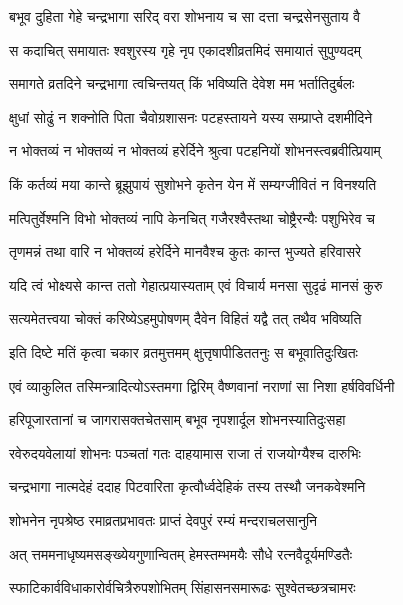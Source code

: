 \twolineshloka
{बभूव दुहिता गेहे चन्द्रभागा सरिद् वरा}
{शोभनाय च सा दत्ता चन्द्रसेनसुताय वै} %

\twolineshloka
{स कदाचित् समायातः श्वशुरस्य गृहे नृप}
{एकादशीव्रतमिदं समायातं सुपुण्यदम्} %

\twolineshloka
{समागते व्रतदिने चन्द्रभागा त्वचिन्तयत्}
{किं भविष्यति देवेश मम भर्तातिदुर्बलः} %

\twolineshloka
{क्षुधां सोढुं न शक्नोति पिता चैवोग्रशासनः}
{पटहस्तायने यस्य सम्प्राप्ते दशमीदिने} %

\twolineshloka
{न भोक्तव्यं न भोक्तव्यं न भोक्तव्यं हरेर्दिने}
{श्रुत्वा पटहनियों शोभनस्त्वब्रवीत्प्रियाम्} %

\twolineshloka
{किं कर्तव्यं मया कान्ते ब्रूझुपायं सुशोभने}
{कृतेन येन में सम्यग्जीवितं न विनश्यति} %


\twolineshloka
{मत्पितुर्वेश्मनि विभो भोक्तव्यं नापि केनचित्}
{गजैरश्वैस्तथा चोष्ट्रैरन्यैः पशुभिरेव च} %

\twolineshloka
{तृणमन्नं तथा वारि न भोक्तव्यं हरेर्दिने}
{मानवैश्च कुतः कान्त भुज्यते हरिवासरे} %

\twolineshloka
{यदि त्वं भोक्ष्यसे कान्त ततो गेहात्प्रयास्यताम्}
{एवं विचार्य मनसा सुदृढं मानसं कुरु} %


\twolineshloka
{सत्यमेतत्त्वया चोक्तं करिष्येऽहमुपोषणम्}
{दैवेन विहितं यद्वै तत् तथैव भविष्यति} %

\twolineshloka
{इति दिष्टे मतिं कृत्वा चकार व्रतमुत्तमम्}
{क्षुत्तृषापीडिततनुः स बभूवातिदुःखितः} %

\twolineshloka
{एवं व्याकुलित तस्मिन्त्रादित्योऽस्तमगा द्विरिम्}
{वैष्णवानां नराणां सा निशा हर्षविवर्धिनी} %

\twolineshloka
{हरिपूजारतानां च जागरासक्तचेतसाम्}
{बभूव नृपशार्दूल शोभनस्यातिदुःसहा} %

\twolineshloka
{रवेरुदयवेलायां शोभनः पञ्चतां गतः}
{दाहयामास राजा तं राजयोग्यैश्च दारुभिः} %

\twolineshloka
{चन्द्रभागा नात्मदेहं ददाह पिटवारिता}
{कृत्वौर्ध्वदेहिकं तस्य तस्थौ जनकवेश्मनि} %

\twolineshloka
{शोभनेन नृपश्रेष्ठ रमाव्रतप्रभावतः}
{प्राप्तं देवपुरं रम्यं मन्दराचलसानुनि} %

\twolineshloka
{अत् त्तममनाधृष्यमसङ्ख्येयगुणान्वितम्}
{हेमस्तम्भमयैः सौधे रत्नवैदूर्यमण्डितैः} %

\twolineshloka
{स्फाटिकार्वविधाकारोर्वचित्रैरुपशोभितम्}
{सिंहासनसमारूढः सुश्वेतच्छत्रचामरः} %

